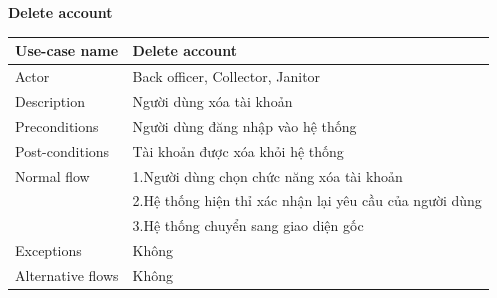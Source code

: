 \documentclass[a4paper]{article}
\begin{document}
\begin{enumerate}
\begin{tabular}{| p{3cm} | p{10cm} |}
\end{tabular}\\
\vspace{0.5cm}\\
\textbf{Delete account} \\
\begin{tabular}{| p{3cm} | p{10cm} |}
  \hline
     Use-case name & Delete account
     \\
     \hline
     Actor & Back officer, Collector, Janitor
     \\ \hline
     Description & Người dùng xóa tài khoản
      \\
     \hline
     Preconditions & Người dùng đăng nhập vào hệ thống
     \\ \hline
           Post-conditions & Tài khoản được xóa khỏi hệ thống
     \\ \hline
      Normal flow & 1.Người dùng chọn chức năng xóa tài khoản \\
& 2.Hệ thống hiện thỉ xác nhận lại yêu cầu của người dùng \\
& 3.Hệ thống chuyển sang giao diện gốc\\
\hline
     Exceptions & Không
     \\ \hline
     Alternative flows & Không
     \\ \hline
     
\end{tabular}\\





\end{enumerate}
\end{document}
